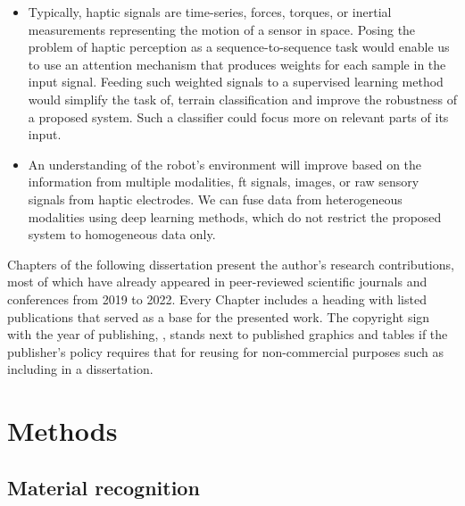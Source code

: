 \documentclass[a4paper, 10pt, twoside]{report}
\begin{document}
\begin{itemize}  
    \item Typically, haptic signals are time-series, \eg forces, torques, or inertial measurements representing the motion of a sensor in space. Posing the problem of haptic perception as a sequence-to-sequence task would enable us to use an attention mechanism that produces weights for each sample in the input signal. Feeding such weighted signals to a supervised learning method would simplify the task of, \eg terrain classification and improve the robustness of a proposed system. Such a classifier could focus more on relevant parts of its input.
    
    \item An understanding of the robot’s environment will improve based on the information from multiple modalities, \eg \acrshort{ft} signals, images, or raw sensory signals from haptic electrodes. We can fuse data from heterogeneous modalities using deep learning methods, which do not restrict the proposed system to homogeneous data only.

\end{itemize}

\begin{notefromauthor}
    Chapters of the following dissertation present the author's research contributions, most of which have already appeared in peer-reviewed scientific journals and conferences from 2019 to 2022. Every Chapter includes a heading with listed publications that served as a base for the presented work. The copyright sign with the year of publishing, \eg{}, stands next to published graphics and tables if the publisher's policy requires that for reusing for non-commercial purposes such as including in a dissertation.
\end{notefromauthor}

\part{Methods}
\label{part:methods}

\chapter{Material recognition}
\label{part:methods:materials}
\end{document}
